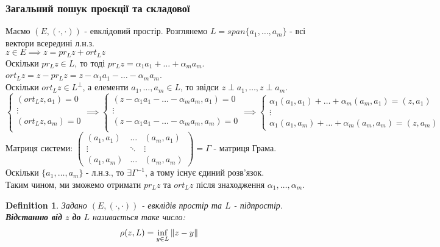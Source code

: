 \documentclass[a4paper, 10pt]{article}
\theoremstyle{theoremdd}
\newtheorem{definition}[theorem]{Definition}
\begin{document}
\subsubsection*{Загальний пошук проєкції та складової}
Маємо $(E,(\cdot, \cdot))$ - евклідовий простір. Розглянемо $L = span\{a_1,\dots,a_m\}$ - всі вектори всередині л.н.з.\\
$z \in E \implies z = pr_L z + ort_L z$\\
Оскільки $pr_L z \in L$, то тоді $pr_L z = \alpha_1 a_1 + \dots + \alpha_m a_m$.\\
$ort_L z = z - pr_L z = \displaystyle z - \alpha_1 a_1 - \dots - \alpha_m a_m$.\\
Оскільки $ort_L z \in L^\perp$, а елементи $a_1,\dots,a_m \in L$, то звідси $z \perp a_1, \dots, z \perp a_m$.\\
$\begin{cases}
(ort_L z, a_1) = 0 \\
\vdots \\
(ort_L z, a_m) = 0 \\
\end{cases} \implies
\begin{cases}
(\displaystyle z - \alpha_1 a_1 - \dots - \alpha_m a_m, a_1) = 0 \\
\vdots \\
(\displaystyle z - \alpha_1 a_1 - \dots - \alpha_m a_m,a_m) = 0 \\
\end{cases} \implies
\begin{cases}
\alpha_1 (a_1,a_1) + \dots + \alpha_m (a_m,a_1) = (z,a_1) \\
\vdots \\
\alpha_1 (a_1,a_m) + \dots + \alpha_m (a_m,a_m) = (z,a_m)
\end{cases}
$\\
Матриця системи: $\begin{pmatrix}
 (a_1,a_1) & \dots & (a_m,a_1) \\
 \vdots & \ddots & \vdots \\
 (a_1,a_m) & \dots & (a_m,a_m)
\end{pmatrix} = \Gamma$ - матриця Грама.\\
Оскільки $\{a_1,\dots,a_m\}$ - л.н.з., то $\exists \Gamma^{-1}$, а тому існує єдиний розв'язок.\\
Таким чином, ми зможемо отримати $pr_L z$ та $ort_L z$ після знаходження $\alpha_1,\dots,\alpha_m$.

\begin{definition}
Задано $(E,(\cdot,\cdot))$ - евклідів простір та $L$ - підпростір.\\
\textbf{Відстанню від} $z$ \textbf{до} $L$ називається таке число:
\begin{align*}
\rho (z,L) = \inf_{y \in L} \norm{z-y}
\end{align*}
\end{definition}
\end{document}
